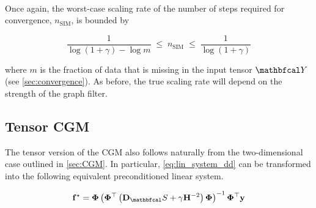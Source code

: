\begin{algorithm}[t]
\begin{algorithmic}
        \vspace{0.15cm}
        \vspace{0.25cm}
        \EndFor
        \EndFor \\
        \hspace*{0.1cm} 
        \EndFor
        \vspace{0.5cm}
        \vspace{0.15cm}
        \State{$ \Ft  \leftarrow \Delta\Ft$}
        \vspace{0.15cm}
        \vspace{0.15cm}
        \vspace{0.15cm}
        \State{$ \Ft \leftarrow  \Ft  + \Delta\Ft$}
        \vspace{0.15cm}
        \EndWhile
        \vspace{0.5cm}
        \Ensure{$ \Ft $}
        \vspace{0.15cm}
        \label{al:SIM_dd}
    \end{algorithmic}
\end{algorithm}

Once again, the worst-case scaling rate of the number of steps required for convergence, $n_{\text{SIM}}$, is bounded by

$$
\frac{1}{\log(1 + \gamma) - \log m} \; \leq \; n_{\text{SIM}} \; \leq \; \frac{1}{\log(1 + \gamma)}
$$

where $m$ is the fraction of data that is missing in the input tensor $\Yt$ (see \cref{sec:convergence}). As before, the true scaling rate will depend on the strength of the graph filter. 

\subsection{Tensor CGM}

\label{sec:CGM_dd}

The tensor version of the CGM also follows naturally from the two-dimensional case outlined in \cref{sec:CGM}. In particular, \cref{eq:lin_system_dd} can be transformed into the following equivalent preconditioned linear system. 

\begin{equation}
    \label{eq:lin_system_precon_dd}
    \f^{\star} = \PHI \left( \PHI^\top \left(\D_\St + \gamma \HH^{-2}\right)\PHI \right)^{-1}\PHI^\top \y
\end{equation}


